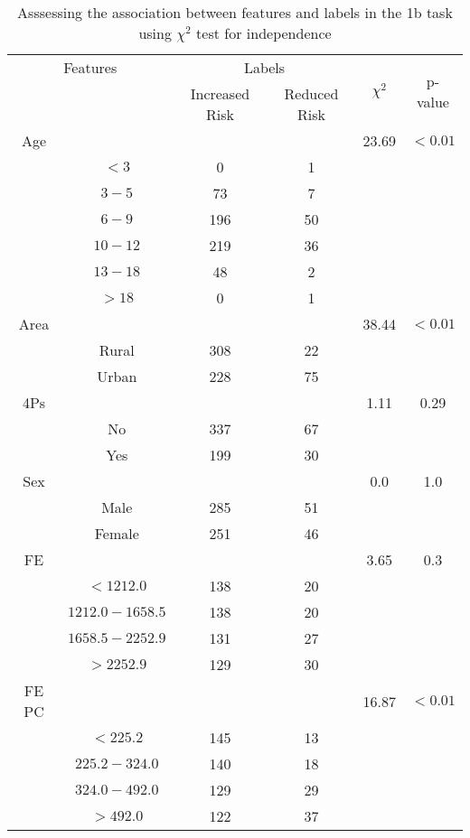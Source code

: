 \begin{table}[!htb]
\centering
\caption{Asssessing the association between features and labels in the 1b task using $\chi^2$ test for independence}
\label{tab:chitest_1b}
\begin{tabular}{c c | c c| c | c}
\hline
\multicolumn{2}{c|}{Features}& \multicolumn{2}{c|}{Labels}& \multirow{2}{*}{$\chi^2$} & \multirow{2}{*}{p-value}\\ 
& & Increased Risk & Reduced Risk & & \\ 
\hline
Age &  &  & & 23.69 & $< 0.01$ \\ 
& $< 3$ & 0 & 1& & \\ 
& $3-5$ & 73 & 7& & \\ 
& $6-9$ & 196 & 50& & \\ 
& $10-12$ & 219 & 36& & \\ 
& $13-18$ & 48 & 2& & \\ 
& $> 18$ & 0 & 1& & \\ 
\hline 
Area &  &  & & 38.44 & $< 0.01$ \\ 
& Rural & 308 & 22& & \\ 
& Urban & 228 & 75& & \\ 
\hline 
4Ps &  &  & & 1.11 & 0.29 \\ 
& No & 337 & 67& & \\ 
& Yes & 199 & 30& & \\ 
\hline 
Sex &  &  & & 0.0 & 1.0 \\ 
& Male & 285 & 51& & \\ 
& Female & 251 & 46& & \\ 
\hline 
FE &  &  & & 3.65 & 0.3 \\ 
& $< 1212.0$ & 138 & 20& & \\ 
& $1212.0-1658.5$ & 138 & 20& & \\ 
& $1658.5-2252.9$ & 131 & 27& & \\ 
& $> 2252.9$ & 129 & 30& & \\ 
\hline 
FE PC &  &  & & 16.87 & $< 0.01$ \\ 
& $< 225.2$ & 145 & 13& & \\ 
& $225.2-324.0$ & 140 & 18& & \\ 
& $324.0-492.0$ & 129 & 29& & \\ 
& $> 492.0$ & 122 & 37& & \\ 
\hline 
\end{tabular}
\end{table}
